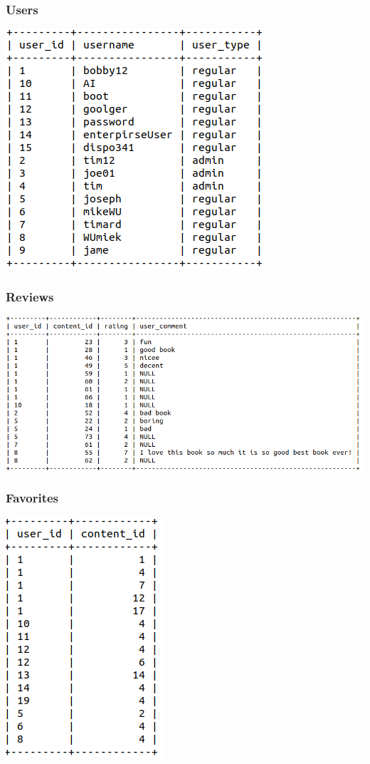 \documentclass[letter, 12pt, titlepage]{article}
\begin{document}
		\subsubsection{Users}
			\includegraphics[scale=.5]{users.png}
		\subsubsection{Reviews}
			\includegraphics[scale=.5]{reviews.png}
		\subsubsection{Favorites}
			\includegraphics[scale=.5]{favorites.png}
\end{document}
